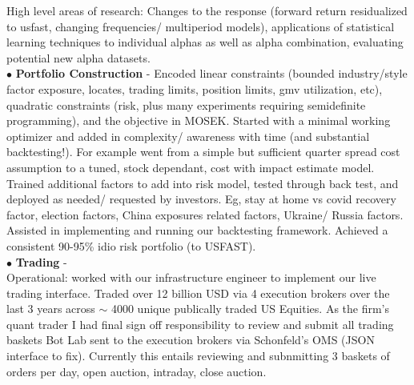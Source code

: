 \documentclass[a4paper,20pt]{article}
\begin{document}
{                 High level areas of research: Changes to the response (forward return residualized to usfast, changing frequencies/ multiperiod models), applications of statistical learning techniques to
                 individual alphas as well as alpha combination, evaluating potential new alpha datasets.
                 \\$\bullet$ \textbf{Portfolio Construction} - Encoded linear constraints (bounded industry/style factor exposure, locates, trading limits, position limits, gmv utilization, etc), quadratic
                 constraints (risk, plus many experiments requiring semidefinite programming), and the objective in MOSEK. Started with a minimal working optimizer and added in complexity/ awareness with time (and
                 substantial backtesting!). For example went from a simple but sufficient quarter spread cost
                 assumption to a tuned, stock dependant, cost with impact estimate model. Trained additional factors to add into risk model, tested through back test, and deployed as needed/ requested by
                 investors. Eg, stay at home vs covid recovery factor, election factors, China exposures related factors, Ukraine/ Russia factors. Assisted in implementing and running our backtesting framework.
                 Achieved a consistent 90-95\% idio risk portfolio (to USFAST).
                 \\$\bullet$ \textbf{Trading} -\\
                 Operational: worked with our infrastructure engineer to implement our live trading interface.
                 Traded over 12 billion USD via 4 execution brokers over the last 3 years across $\sim$ 4000 unique publically traded US Equities. As the firm's
                 quant trader I had final sign off responsibility to review and submit all trading baskets Bot Lab sent to the execution brokers via Schonfeld's OMS (JSON interface to fix).
                 Currently this entails reviewing and subnmitting 3 baskets of orders per day, open auction, intraday, close auction.

}
\end{document}
